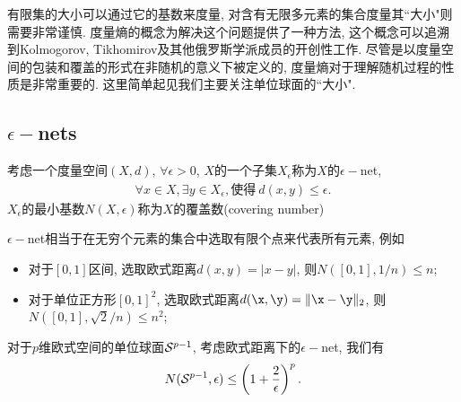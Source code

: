 有限集的大小可以通过它的基数来度量, 对含有无限多元素的集合度量其``大小"则需要非常谨慎. 度量熵的概念为解决这个问题提供了一种方法, 这个概念可以追溯到Kolmogorov, Tikhomirov及其他俄罗斯学派成员的开创性工作. 尽管是以度量空间的包装和覆盖的形式在非随机的意义下被定义的, 度量熵对于理解随机过程的性质是非常重要的. 这里简单起见我们主要关注单位球面的``大小".

\subsection{$\epsilon-$nets}

\begin{defin} 考虑一个度量空间$(X,d)$, $\forall \epsilon>0$, $X$的一个子集$X_\epsilon$称为$X$的$\epsilon-$net,
    \begin{align*}
        \forall x \in X, \exists y \in X_{\epsilon}, \mbox{使得}~d(x,y)\leq \epsilon.
    \end{align*}
    $X_\epsilon$的最小基数$N(X,\epsilon)$称为$X$的覆盖数(covering number)   
\end{defin}

$\epsilon-$net相当于在无穷个元素的集合中选取有限个点来代表所有元素, 例如
\begin{itemize}
    \item 对于$[0,1]$区间, 选取欧式距离$d(x,y)=|x-y|$, 则$N\left([0,1],1/n\right)\leq n$;
    \item 对于单位正方形$[0,1]^2$, 选取欧式距离$d(\x,\y)=\|\x-\y\|_2$, 则$N\left([0,1],\sqrt{2}/n\right)\leq n^2$;
\end{itemize}

\begin{lem}[单位球面的覆盖数]
   对于$p$维欧式空间的单位球面$\mathcal{S}^{p-1}$, 考虑欧式距离下的$\epsilon-$net, 我们有
   \begin{align*}
    N(\mathcal{S}^{p-1},\epsilon) \leq \left(1+\frac{2}{\epsilon}\right)^p.
   \end{align*} 
\end{lem}


